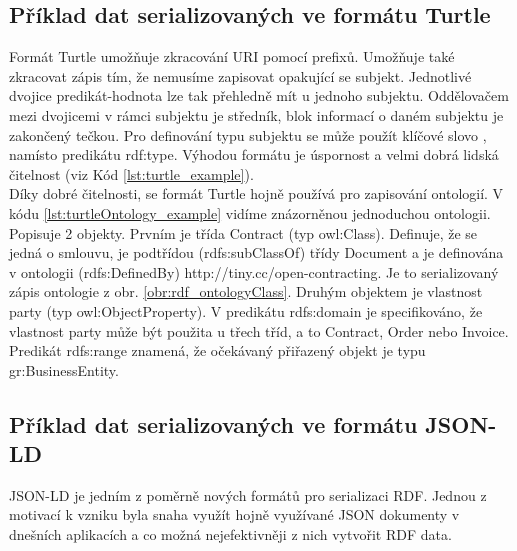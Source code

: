 

\subsection{Příklad dat serializovaných ve formátu Turtle}

Formát Turtle umožňuje zkracování URI pomocí prefixů. Umožňuje také zkracovat zápis tím, že nemusíme zapisovat opakující se subjekt. Jednotlivé dvojice predikát-hodnota lze tak přehledně mít u jednoho subjektu. Oddělovačem mezi dvojicemi v rámci subjektu je středník, blok informací o daném subjektu je zakončený tečkou. Pro definování typu subjektu se může použít klíčové slovo , namísto predikátu rdf:type. Výhodou formátu je úspornost a velmi dobrá lidská čitelnost (viz Kód \ref{lst:turtle_example}).\\



Díky dobré čitelnosti, se formát Turtle hojně používá pro zapisování ontologií. V kódu \ref{lst:turtleOntology_example} vidíme znázorněnou jednoduchou ontologii. Popisuje 2 objekty. Prvním je třída Contract (typ owl:Class). Definuje, že se jedná o smlouvu, je podtřídou (rdfs:subClassOf) třídy Document a je definována v ontologii (rdfs:DefinedBy) http://tiny.cc/open-contracting. Je to serializovaný zápis ontologie z obr. \ref{obr:rdf_ontologyClass}. Druhým objektem je vlastnost party (typ owl:ObjectProperty). V predikátu rdfs:domain je specifikováno, že vlastnost party může být použita u třech tříd, a to Contract, Order nebo Invoice. Predikát rdfs:range znamená, že očekávaný přiřazený objekt je typu gr:BusinessEntity.\\



\subsection{Příklad dat serializovaných ve formátu JSON-LD}

JSON-LD je jedním z poměrně nových formátů pro serializaci RDF. Jednou z motivací k vzniku byla snaha využít hojně využívané JSON dokumenty v dnešních aplikacích a co možná nejefektivněji z nich vytvořit RDF data.

